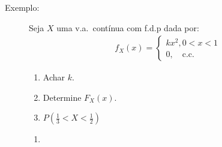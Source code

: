      \begin{description}

       \item [Exemplo:] 
         Seja $X$ uma v.a.\ contínua com f.d.p dada por:
         \begin{align*}
           f_{X}(x) = 
           \begin{cases} 
             k x^2, 0 < x < 1 \\
             0, \quad \text{c.c.\ }
           \end{cases}
         \end{align*}
         \begin{enumerate}[label=(\alph*)]
           \item Achar $k$.
           \item Determine ${F}_{X} (x)$.
           \item $P (\frac{1}{3} < X < \frac{1}{2})$
         \end{enumerate} 

         \begin{enumerate}[label=(\alph*)]
           \item 


\end{enumerate}
\end{description}
